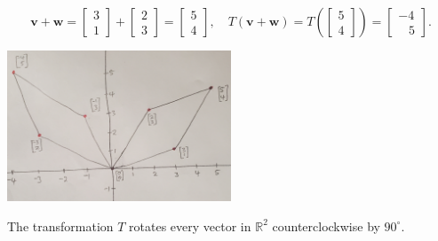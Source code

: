 \documentclass[a4paper,11pt,reqno]{amsart}
\numberwithin{equation}{section}
\begin{document}
\begin{enumerate}
\begin{center}
{{\[
\mathbf{v} + \mathbf{w} =
\begin{bmatrix} 3 \\ 1 \end{bmatrix}
+
\begin{bmatrix} 2 \\ 3 \end{bmatrix}
=
\begin{bmatrix} 5 \\ 4 \end{bmatrix},
\quad
T(\mathbf{v} + \mathbf{w})=T\left(
\begin{bmatrix} 5 \\ 4 \end{bmatrix}
\right) =
\begin{bmatrix} -4 \\ \;\;\;5 \end{bmatrix}.
\]
\begin{center}
    \includegraphics[width=0.5\textwidth]{figures/graph.jpg}
\end{center}

The transformation \( T \) rotates every vector in \( \mathbb{R}^2 \) counterclockwise by \( 90^\circ \).


}}
\end{center}
\end{enumerate}
\end{document}
